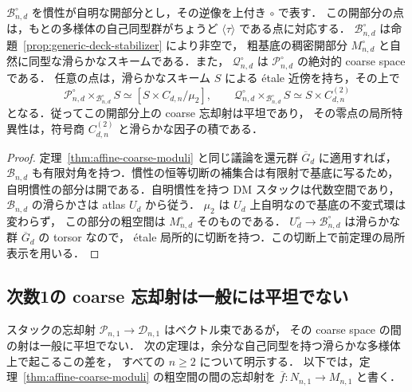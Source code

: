 \begin{corollary}[被覆の対合だけを持つ開部分の局所模型]
\label{cor:deck-only-coarse-model}
$\mathcal B_{n,d}^{\circ}$ を慣性が自明な開部分とし，その逆像を上付き $\circ$ で表す．
この開部分の点は，もとの多様体の自己同型群がちょうど $\langle\tau\rangle$ である点に対応する．
$\mathcal B_{n,d}^{\circ}$ は命題~\ref{prop:generic-deck-stabilizer} により非空で，
粗基底の稠密開部分 $M_{n,d}^{\circ}$ と自然に同型な滑らかなスキームである．また，
$\mathcal Q_{n,d}^{\circ}$ は $\mathcal P_{n,d}^{\circ}$ の絶対的 coarse space である．
任意の点は，滑らかなスキーム $S$ による \'{e}tale 近傍を持ち，その上で
\[
 \mathcal P_{n,d}^{\circ}\times_{\mathcal B_{n,d}^{\circ}}S
 \simeq[S\times C_{d,n}/\mu_2],\qquad
 \mathcal Q_{n,d}^{\circ}\times_{\mathcal B_{n,d}^{\circ}}S
 \simeq S\times C_{d,n}^{(2)}
\]
となる．従ってこの開部分上の coarse 忘却射は平坦であり，
その零点の局所特異性は，符号商 $C_{d,n}^{(2)}$ と滑らかな因子の積である．
\end{corollary}
\begin{proof}
定理~\ref{thm:affine-coarse-moduli} と同じ議論を還元群 $\overline G_d$ に適用すれば，
$\mathcal B_{n,d}$ も有限対角を持つ．慣性の恒等切断の補集合は有限射で基底に写るため，
自明慣性の部分は開である．自明慣性を持つ DM スタックは代数空間であり，
$\mathcal B_{n,d}$ の滑らかさは atlas $U_d$ から従う．
$\mu_2$ は $U_d$ 上自明なので基底の不変式環は変わらず，
この部分の粗空間は $M_{n,d}^{\circ}$ そのものである．
$U_d^{\circ}\to\mathcal B_{n,d}^{\circ}$ は滑らかな群 $\overline G_d$ の torsor なので，
\'{e}tale 局所的に切断を持つ．この切断上で前定理の局所表示を用いる．
\end{proof}

\subsection{次数1の coarse 忘却射は一般には平坦でない}

スタックの忘却射 $\mathcal P_{n,1}\to\mathcal D_{n,1}$ はベクトル束であるが，
その coarse space の間の射は一般に平坦でない．
次の定理は，余分な自己同型を持つ滑らかな多様体上で起こるこの差を，
すべての $n\geq2$ について明示する．
以下では，定理~\ref{thm:affine-coarse-moduli} の粗空間の間の忘却射を
$\overline f:N_{n,1}\to M_{n,1}$ と書く．


